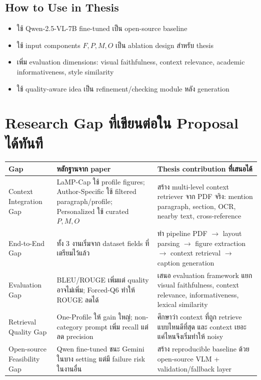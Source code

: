\documentclass[10pt,a4paper]{article}
\begin{document}
\subsection{How to Use in Thesis}
\begin{itemize}
\item ใช้ Qwen-2.5-VL-7B fine-tuned เป็น open-source baseline
\item ใช้ input components \(F, P, M, O\) เป็น ablation design สำหรับ thesis
\item เพิ่ม evaluation dimensions: visual faithfulness, context relevance, academic informativeness, style similarity
\item ใช้ quality-aware idea เป็น refinement/checking module หลัง generation
\end{itemize}

\section{Research Gap ที่เขียนต่อใน Proposal ได้ทันที}

\begin{longtable}{@{}L{3.1cm}L{5.5cm}L{6.1cm}@{}}
\toprule
\textbf{Gap} & \textbf{หลักฐานจาก paper} & \textbf{Thesis contribution ที่เสนอได้} \\
\midrule
Context Integration Gap & LaMP-Cap ใช้ profile figures; Author-Specific ใช้ filtered paragraph/profile; Personalized ใช้ curated \(P,M,O\) & สร้าง multi-level context retriever จาก PDF จริง: mention paragraph, section, OCR, nearby text, cross-reference \\
End-to-End Gap & ทั้ง 3 งานเริ่มจาก dataset fields ที่เตรียมไว้แล้ว & ทำ pipeline PDF \(\rightarrow\) layout parsing \(\rightarrow\) figure extraction \(\rightarrow\) context retrieval \(\rightarrow\) caption generation \\
Evaluation Gap & BLEU/ROUGE เพิ่มแต่ quality อาจไม่เพิ่ม; Forced-Q6 ทำให้ ROUGE ลดได้ & เสนอ evaluation framework แยก visual faithfulness, context relevance, informativeness, lexical similarity \\
Retrieval Quality Gap & One-Profile ให้ gain ใหญ่; non-category prompt เพิ่ม recall แต่ลด precision & ศึกษาว่า context ที่ถูก retrieve แบบไหนดีที่สุด และ context เยอะแค่ไหนจึงเริ่มทำให้ noisy \\
Open-source Feasibility Gap & Qwen fine-tuned ชนะ Gemini ในบาง setting แต่มี failure risk ในงานอื่น & สร้าง reproducible baseline ด้วย open-source VLM + validation/fallback layer \\
\bottomrule
\end{longtable}
\end{document}
